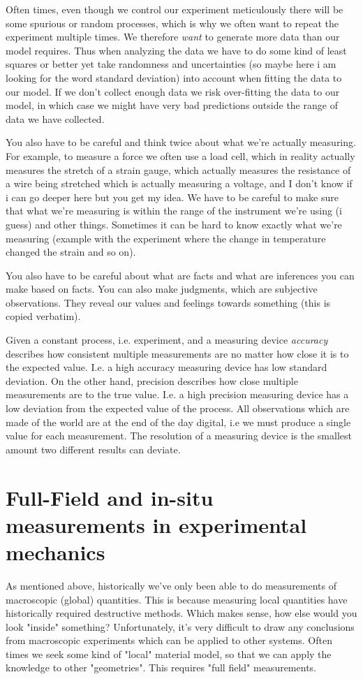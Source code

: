 Often times, even though we control our experiment meticulously there will be some spurious or random processes, which is why we often want to repeat the experiment multiple times. We therefore \textit{want} to generate more data than our model requires. Thus when analyzing the data we have to do some kind of least squares or better yet take randomness and uncertainties (so maybe here i am looking for the word standard deviation) into account when fitting the data to our model. If we don't collect enough data we risk over-fitting the data to our model, in which case we might have very bad predictions outside the range of data we have collected.

You also have to be careful and think twice about what we're actually measuring. For example, to measure a force we often use a load cell, which in reality actually measures the stretch of a strain gauge, which actually measures the resistance of a wire being stretched which is actually measuring a voltage, and I don't know if i can go deeper here but you get my idea. We have to be careful to make sure that what we're measuring is within the range of the instrument we're using (i guess) and other things. Sometimes it can be hard to know exactly what we're measuring (example with the experiment where the change in temperature changed the strain and so on).

You also have to be careful about what are facts and what are inferences you can make based on facts. You can also make judgments, which are subjective observations. They reveal our values and feelings towards something (this is copied verbatim).

Given a constant process, i.e. experiment, and a measuring device \textit{accuracy} describes how consistent multiple measurements are no matter how close it is to the expected value. I.e. a high accuracy measuring device has low standard deviation. On the other hand, precision describes how close multiple measurements are to the true value. I.e. a high precision measuring device has a low deviation from the expected value of the process. All observations which are made of the world are at the end of the day digital, i.e we must produce a single value for each measurement. The resolution of a measuring device is the smallest amount two different results can deviate.


\section{Full-Field and in-situ measurements in experimental mechanics}
As mentioned above, historically we've only been able to do measurements of macroscopic (global) quantities. This is because measuring local quantities have historically required destructive methods. Which makes sense, how else would you look "inside" something? Unfortunately, it's very difficult to draw any conclusions from macroscopic experiments which can be applied to other systems. Often times we seek some kind of "local" material model, so that we can apply the knowledge to other "geometries". This requires "full field" measurements. 

